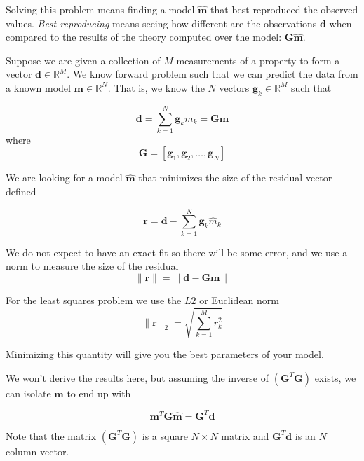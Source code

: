 \documentclass{article}
\newcommand{\real}{\mathbb{R}}
\begin{document}
Solving this problem means finding a model $\mathbf{\hat{m}}$ that
best reproduced the observed values. \emph{Best reproducing} means
seeing how different are the observations $\mathbf{d}$ when compared
to the results of the theory computed over the model: $\mathbf{G}
\mathbf{\hat{m}}$. 

Suppose we are given a collection of $M$ measurements of a property to
form a vector $\mathbf{d} \in \real^M$. We know forward problem such
that we can predict the data from a known model $\mathbf{m} \in
\real^N$. That is, we know the $N$ vectors $\mathbf{g}_k \in \real^M$
such that   

\begin{equation}
\mathbf{d} = \sum_{k=1}^{N} \mathbf{g}_k m_k = \mathbf{G} \mathbf{m}
\end{equation}
where
\begin{equation}
\mathbf{G} = \left[ \mathbf{g}_1, \mathbf{g}_2, \dots, \mathbf{g}_N \right] 
\end{equation}

We are looking for a model $\hat{\mathbf{m}}$ that minimizes the size
of the residual vector defined 

\begin{equation}
\mathbf{r} = \mathbf{d} -  \sum_{k=1}^{N} \mathbf{g}_k \hat{m}_k
\end{equation}

We do not expect to have an exact fit so there will be some error, and
we use a norm to measure the size of the residual 
\begin{equation}
\| \mathbf{r} \| = \| \mathbf{d} - \mathbf{Gm} \|
\end{equation}

For the least squares problem we use the $L2$ or Euclidean norm 
\begin{equation}
\| \mathbf{r} \|_2 = \sqrt{\sum_{k=1}^M r^2_k}
\end{equation}

Minimizing this quantity will give you the best parameters of your model.


We won't derive the results here, but assuming the inverse of $(\mathbf{G}^T \mathbf{G})$ exists, we can isolate $\hat{\mathbf{m}}$ to end up with

\begin{equation}
\mathbf{m}^T \mathbf{G}\hat{\mathbf{m}} = \mathbf{G}^T \mathbf{d}   
\label{eq:mlsq}
\end{equation}

Note that the matrix ${(\mathbf{G}^T \mathbf{G})}$ is a square
$N\times N$ matrix and $\mathbf{G}^T\mathbf{d}$ is an $N$ column
vector.  
\end{document}
